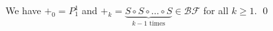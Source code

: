\begin{pf} \rm We have $+_0 = P_1^1$ and
$+_k=\underbrace{S\circ S\circ \ldots \circ S}_{\textrm{$k-1$ times}}\in\mathcal{BF}$
for all $k\geq 1$. \qed
\end{pf}

